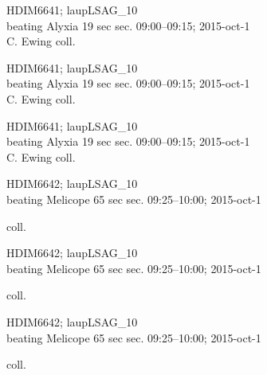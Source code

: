 \documentclass[2pt]{extarticle}
\begin{document}
\noindent
\parbox{0.16\textwidth}{\tiny \raggedright \rule[-0.3\baselineskip]{0pt}{10pt}HDIM6641; laupLSAG\_10\\ beating Alyxia 19 sec sec. 09:00--09:15; 2015-oct-1\\ C. Ewing coll.}
\parbox{0.16\textwidth}{\tiny \raggedright \rule[-0.3\baselineskip]{0pt}{10pt}HDIM6641; laupLSAG\_10\\ beating Alyxia 19 sec sec. 09:00--09:15; 2015-oct-1\\ C. Ewing coll.}
\parbox{0.16\textwidth}{\tiny \raggedright \rule[-0.3\baselineskip]{0pt}{10pt}HDIM6641; laupLSAG\_10\\ beating Alyxia 19 sec sec. 09:00--09:15; 2015-oct-1\\ C. Ewing coll.}
\parbox{0.16\textwidth}{\tiny \raggedright \rule[-0.3\baselineskip]{0pt}{10pt}HDIM6642; laupLSAG\_10\\ beating Melicope 65 sec sec. 09:25--10:00; 2015-oct-1\\ \rule{0ex}{0ex}\hspace{6em} coll.}
\parbox{0.16\textwidth}{\tiny \raggedright \rule[-0.3\baselineskip]{0pt}{10pt}HDIM6642; laupLSAG\_10\\ beating Melicope 65 sec sec. 09:25--10:00; 2015-oct-1\\ \rule{0ex}{0ex}\hspace{6em} coll.}
\parbox{0.16\textwidth}{\tiny \raggedright \rule[-0.3\baselineskip]{0pt}{10pt}HDIM6642; laupLSAG\_10\\ beating Melicope 65 sec sec. 09:25--10:00; 2015-oct-1\\ \rule{0ex}{0ex}\hspace{6em} coll.} \\ 
\vspace{0.001in} 
\end{document}
